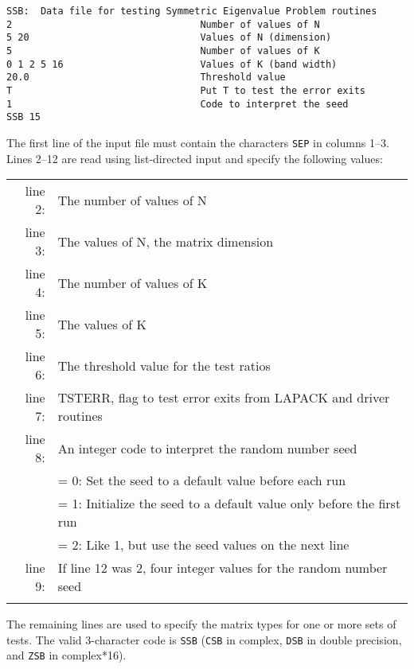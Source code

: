 \begin{verbatim}
SSB:  Data file for testing Symmetric Eigenvalue Problem routines
2                                 Number of values of N
5 20                              Values of N (dimension)
5                                 Number of values of K
0 1 2 5 16                        Values of K (band width)
20.0                              Threshold value
T                                 Put T to test the error exits
1                                 Code to interpret the seed
SSB 15

\end{verbatim}

The first line of the input file 
must contain the characters {\tt SEP} in columns 1--3.
Lines 2--12 are read using list-directed input and specify the following
values:

\begin{tabular}{r l}
\\
line 2: & The number of values of N \\
line 3: & The values of N, the matrix dimension \\
line 4: & The number of values of K \\
line 5: & The values of K \\
line 6: & The threshold value for the test ratios \\
line 7:& TSTERR, flag to test error exits from LAPACK and driver
routines \\
line 8: & An integer code to interpret the random number seed \\
        & = 0:  Set the seed to a default value before each run \\
        & = 1:  Initialize the seed to a default value only before the
first run \\
        & = 2:  Like 1, but use the seed values on the next line \\
line 9:& If line 12 was 2, four integer values for the random number
seed \\
        &
\end{tabular}

\noindent
The remaining lines are used to specify the matrix types for one
or more sets of tests.
The valid 3-character code is {\tt SSB} ({\tt CSB}
in complex, {\tt DSB} in double precision, and {\tt ZSB} in
complex*16).

